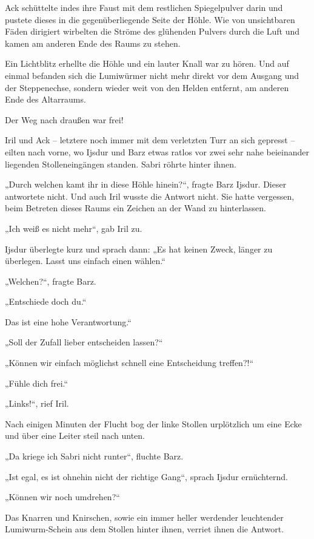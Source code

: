 Ack schüttelte indes ihre Faust mit dem restlichen Spiegelpulver darin und pustete dieses in die gegenüberliegende Seite der Höhle. Wie von unsichtbaren Fäden dirigiert wirbelten die Ströme des glühenden Pulvers durch die Luft und kamen am anderen Ende des Raums zu stehen.

Ein Lichtblitz erhellte die Höhle und ein lauter Knall war zu hören. Und auf einmal befanden sich die Lumiwürmer nicht mehr direkt vor dem Ausgang und der Steppenechse, sondern wieder weit von den Helden entfernt, am anderen Ende des Altarraums.

Der Weg nach draußen war frei!

Iril und Ack – letztere noch immer mit dem verletzten Turr an sich gepresst – eilten nach vorne, wo Ijsdur und Barz etwas ratlos vor zwei sehr nahe beieinander liegenden Stolleneingängen standen. Sabri röhrte hinter ihnen.

„Durch welchen kamt ihr in diese Höhle hinein?“, fragte Barz Ijsdur. Dieser antwortete nicht. Und auch Iril wusste die Antwort nicht. Sie hatte vergessen, beim Betreten dieses Raums ein Zeichen an der Wand zu hinterlassen.

„Ich weiß es nicht mehr“, gab Iril zu.

Ijsdur überlegte kurz und sprach dann: „Es hat keinen Zweck, länger zu überlegen. Lasst uns einfach einen wählen.“

„Welchen?“, fragte Barz.

„Entschiede doch du.“

Das ist eine hohe Verantwortung.“

„Soll der Zufall lieber entscheiden lassen?“

„Können wir einfach möglichst schnell eine Entscheidung treffen?!“

„Fühle dich frei.“

„Links!“, rief Iril.



\trennzeichen



Nach einigen Minuten der Flucht bog der linke Stollen urplötzlich um eine Ecke und über eine Leiter steil nach unten.

„Da kriege ich Sabri nicht runter“, fluchte Barz.

„Ist egal, es ist ohnehin nicht der richtige Gang“, sprach Ijsdur ernüchternd.

„Können wir noch umdrehen?“

Das Knarren und Knirschen, sowie ein immer heller werdender leuchtender Lumiwurm-Schein aus dem Stollen hinter ihnen, verriet ihnen die Antwort.

